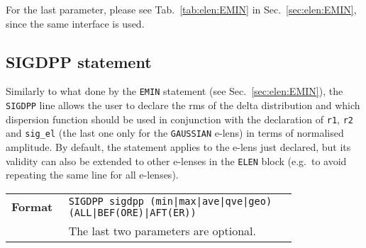 \bigskip
\noindent For the last parameter, please see Tab.~\ref{tab:elen:EMIN} in Sec.~\ref{sec:elen:EMIN}, since the same interface is used.

\subsection{SIGDPP statement}\label{sec:elen:SIGDPP}
Similarly to what done by the \texttt{EMIN} statement (see Sec.~\ref{sec:elen:EMIN}), the \texttt{SIGDPP} line allows the user to declare the rms of the delta distribution and which dispersion function should be used in conjunction with the declaration of \texttt{r1}, \texttt{r2} and \texttt{sig\_el} (the last one only for the \texttt{GAUSSIAN} e-lens) in terms of normalised amplitude. By default, the statement applies to the e-lens just declared, but its validity can also be extended to other e-lenses in the \texttt{ELEN} block (e.g.~to avoid repeating the same line for all e-lenses).

\bigskip
\begin{tabular}{@{}lp{0.8\linewidth}}
    \textbf{Format}     & \texttt{SIGDPP sigdpp (min|max|ave|qve|geo) (ALL|BEF(ORE)|AFT(ER))} \\
    & The last two parameters are optional.  \\
\end{tabular}

